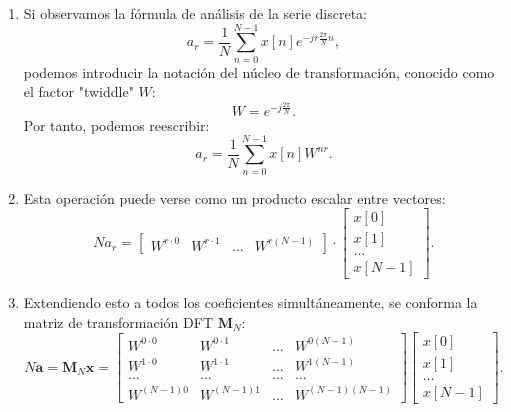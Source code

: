 \documentclass[11pt,a4paper,openany]{book}
\begin{document}
\begin{enumerate}
	\item Si observamos la fórmula de análisis de la serie discreta:
	\begin{equation}
		a_{r} =  \frac{1}{N} \sum_{n=0}^{N-1} x[n] e^{-jr\frac{2\pi}{N}n},
	\end{equation}
	podemos introducir la notación del núcleo de transformación, conocido como el factor "twiddle" $W$:
	\begin{equation}
		W = e^{-j\frac{2\pi}{N}}.
	\end{equation}
	Por tanto, podemos reescribir:
	\begin{equation}
		a_{r} =  \frac{1}{N} \sum_{n=0}^{N-1} x[n] W^{nr}.
	\end{equation}
	
	\item Esta operación puede verse como un producto escalar entre vectores:
	\begin{equation}
		N a_{r} =
		\begin{bmatrix}
			W^{r \cdot 0} & W^{r \cdot 1} & \dots & W^{r(N-1)}
		\end{bmatrix}
		\cdot 
		\begin{bmatrix}
			x[0] \\ x[1] \\ \dots \\ x[N-1]
		\end{bmatrix}.
	\end{equation}
	
	\item Extendiendo esto a todos los coeficientes simultáneamente, se conforma la matriz de transformación DFT $\mathbf{M}_N$:
	\begin{equation}
		N \mathbf{a} = \mathbf{M}_N \mathbf{x} = 
		\begin{bmatrix}
			W^{0 \cdot 0} & W^{0 \cdot 1} & \dots & W^{0(N-1)} \\
			W^{1 \cdot 0} & W^{1 \cdot 1} & \dots & W^{1(N-1)} \\
			\dots & \dots & \dots & \dots \\
			W^{(N-1)0} & W^{(N-1)1} & \dots & W^{(N-1)(N-1)}
		\end{bmatrix}
		\begin{bmatrix}
			x[0] \\ x[1] \\ \dots \\ x[N-1]
		\end{bmatrix}.
	\end{equation}
	

\end{enumerate}
\end{document}
